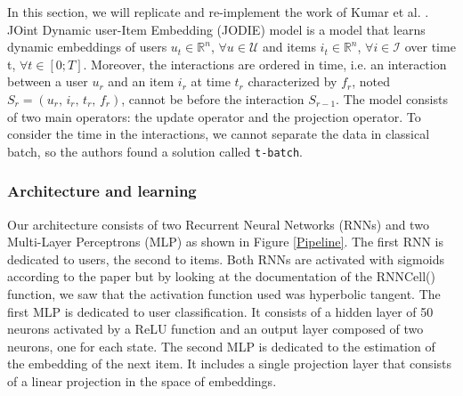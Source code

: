 In this section, we will replicate and re-implement the work of Kumar et al. \supercite{kumar2019predicting}. JOint Dynamic user-Item Embedding (JODIE) model is a model that learns dynamic embeddings of users $u_t \in \mathbb{R}^n$, $\forall u \in \mathcal{U}$ and items $i_t \in \mathbb{R}^n$, $\forall i \in \mathcal{I}$ over time t, $\forall t \in [0; T]$. Moreover, the interactions are ordered in time, i.e. an interaction between a user $u_r$ and an item $i_r$ at time $t_r$ characterized by $f_r$, noted $S_r = (u_r, \, i_r, \, t_r, \, f_r)$, cannot be before the interaction $S_{r-1}$. The model consists of two main operators: the update operator and the projection operator. To consider the time in the interactions, we cannot separate the data in classical batch, so the authors found a solution called \texttt{t-batch}.

\subsubsection{Architecture and learning}

Our architecture consists of two Recurrent Neural Networks (RNNs) and two Multi-Layer Perceptrons (MLP) as shown in Figure \ref{Pipeline}. The first RNN is dedicated to users, the second to items. Both RNNs are activated with sigmoids according to the paper but by looking at the documentation of the RNNCell() function, we saw that the activation function used was hyperbolic tangent. The first MLP is dedicated to user classification. It consists of a hidden layer of 50 neurons activated by a ReLU function and an output layer composed of two neurons, one for each state. The second MLP is dedicated to the estimation of the embedding of the next item. It includes a single projection layer that consists of a linear projection in the space of embeddings.

